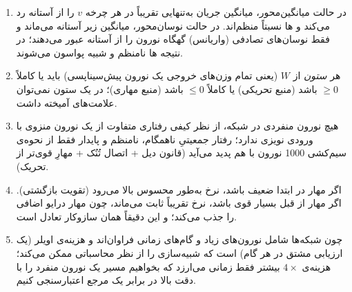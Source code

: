 \documentclass[11pt,a4paper]{article}
\begin{document}
{\begin{enumerate}[itemsep=4pt, leftmargin=1.6em]
		\item در حالت میانگین‌محور، میانگین جریان به‌تنهایی تقریباً در هر چرخه $v$ را از آستانه رد می‌کند و ها نسبتاً منظم‌اند. در حالت نوسان‌محور، میانگین زیر آستانه می‌ماند و فقط نوسان‌های تصادفی
		(واریانس)
		گهگاه نورون را از آستانه عبور می‌دهند؛ در نتیجه ها نامنظم و شبیه پواسون می‌شوند.
		\item هر \emph{ستون} از $W$
		(یعنی تمام وزن‌های خروجی یک نورون پیش‌سیناپسی)
		باید یا کاملاً
		$\ge 0$
		باشد
		(منبع تحریکی)
		یا کاملاً
		$\le 0$
		باشد
		(منبع مهاری)؛
		در یک ستون نمی‌توان علامت‌های آمیخته داشت.
		\item هیچ نورون  منفردی در شبکه، از نظر کیفی رفتاری متفاوت از یک نورون  منزوی با ورودی نویزی ندارد؛ رفتار جمعیتیِ ناهمگام، نامنظم و پایدار فقط از نحوه‌ی سیم‌کشی 1000 نورون با هم پدید می‌آید
		(قانون دیل + اتصال تُنُک + مهارِ قوی‌تر از تحریک).
		\item اگر مهار در ابتدا ضعیف باشد، نرخ به‌طور محسوس بالا می‌رود
		(تقویت بازگشتی).
		اگر مهار از قبل بسیار قوی باشد، نرخ تقریباً ثابت می‌ماند، چون مهار درایو اضافی را جذب می‌کند؛ و این دقیقاً همان سازوکار تعادل است.
		\item چون شبکه‌ها شامل نورون‌های زیاد و گام‌های زمانی فراوان‌اند و هزینه‌ی اویلر
		(یک ارزیابی مشتق در هر گام)
		است که شبیه‌سازی را از نظر محاسباتی ممکن می‌کند؛ هزینه‌ی $4\times$ بیشتر  فقط زمانی می‌ارزد که بخواهیم مسیر یک نورون منفرد را با دقت بالا در برابر یک مرجع اعتبارسنجی کنیم.
	\end{enumerate}
}

\newpage

\end{document}
